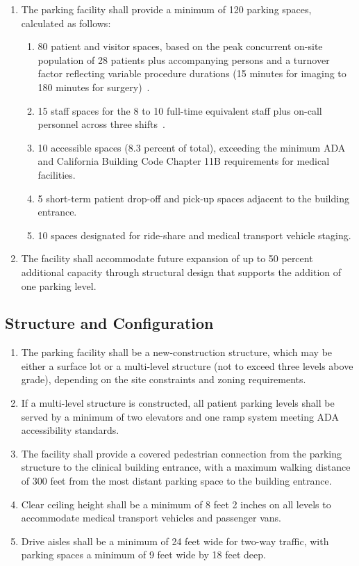 \documentclass[11pt,letterpaper]{article}
\begin{document}
\begin{enumerate}[label=(\alph*)]
\item The parking facility shall provide a minimum of 120 parking spaces,
  calculated as follows:
  \begin{enumerate}[label=(\arabic*)]
  \item 80 patient and visitor spaces, based on the peak concurrent on-site
    population of 28 patients plus accompanying persons and a turnover factor
    reflecting variable procedure durations (15 minutes for imaging to 180
    minutes for surgery)~\cite{newtrial2026,patientinstructions2026}.
  \item 15 staff spaces for the 8 to 10 full-time equivalent staff plus
    on-call personnel across three shifts~\cite{sitespec2026}.
  \item 10 accessible spaces (8.3 percent of total), exceeding the minimum
    ADA and California Building Code Chapter 11B requirements for medical
    facilities.
  \item 5 short-term patient drop-off and pick-up spaces adjacent to the
    building entrance.
  \item 10 spaces designated for ride-share and medical transport vehicle
    staging.
  \end{enumerate}

\item The facility shall accommodate future expansion of up to 50 percent
  additional capacity through structural design that supports the addition
  of one parking level.
\end{enumerate}

\subsection{Structure and Configuration}

\begin{enumerate}[label=(\alph*)]
\item The parking facility shall be a new-construction structure, which may be
  either a surface lot or a multi-level structure (not to exceed three levels
  above grade), depending on the site constraints and zoning requirements.

\item If a multi-level structure is constructed, all patient parking levels
  shall be served by a minimum of two elevators and one ramp system meeting
  ADA accessibility standards.

\item The facility shall provide a covered pedestrian connection from the
  parking structure to the clinical building entrance, with a maximum walking
  distance of 300 feet from the most distant parking space to the building
  entrance.

\item Clear ceiling height shall be a minimum of 8 feet 2 inches on all
  levels to accommodate medical transport vehicles and passenger vans.

\item Drive aisles shall be a minimum of 24 feet wide for two-way traffic,
  with parking spaces a minimum of 9 feet wide by 18 feet deep.
\end{enumerate}
\end{document}
